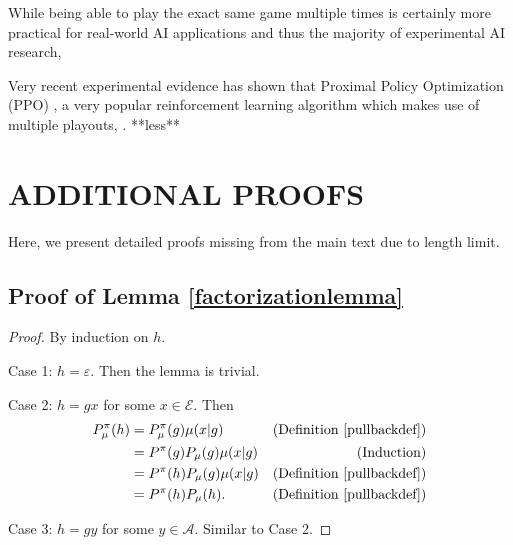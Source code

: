 \documentclass[twoside]{article}
\begin{document}
While being able to play the exact same game multiple times is certainly more practical for real-world AI applications and thus the majority of experimental AI research,

Very recent experimental evidence has shown that Proximal Policy Optimization (PPO) \cite{PPO}, a very popular reinforcement learning algorithm which makes use of multiple playouts, \cite{PPO-bad}.
**less**




\pagebreak

\onecolumn

\setcounter{section}{0}



\section{ADDITIONAL PROOFS}

Here, we present detailed proofs missing from the main text due to length limit.

\subsection{Proof of Lemma \ref{factorizationlemma}}
\begin{proof}
    By induction on $h$.

    Case 1: $h=\varepsilon$. Then the lemma is trivial.

    Case 2: $h=gx$ for some $x\in\mathcal E$.
        Then
        \begin{align*}
            P^\pi_\mu(h)
                &= P^\pi_\mu(g)\mu(x|g)
                    &\mbox{(Definition \ref{pullbackdef})}\\
                &= P^\pi(g)P_\mu(g)\mu(x|g)
                    &\mbox{(Induction)}\\
                &= P^\pi(h)P_\mu(g)\mu(x|g)
                    &\mbox{(Definition \ref{pullbackdef})}\\
                &= P^\pi(h)P_\mu(h).
                    &\mbox{(Definition \ref{pullbackdef})}
        \end{align*}

    Case 3: $h=gy$ for some $y\in\mathcal A$.
        Similar to Case 2.
\end{proof}
\end{document}
